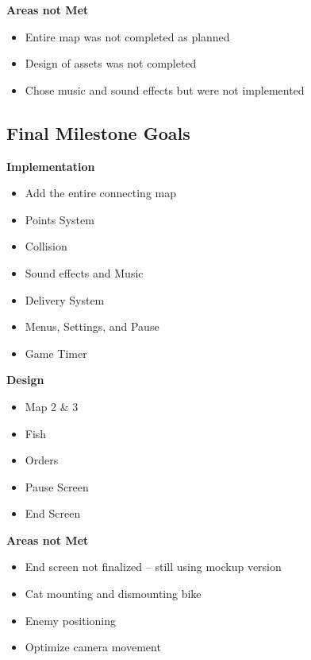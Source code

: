 \documentclass[12pt]{article}
\begin{document}
\bigskip
\begin{minipage}[t]{1\textwidth}
\textbf{Areas not Met}
\begin{itemize}[itemsep=-1pt, topsep=5pt]
    \item Entire map was not completed as planned
    \item Design of assets was not completed
    \item Chose music and sound effects but were not implemented
\end{itemize}
\end{minipage}

\par\bigskip


\subsection{Final Milestone Goals}
\bigskip
\noindent
\hspace{0.52cm}
\begin{minipage}[t]{0.48\textwidth}
\textbf{Implementation}
\begin{itemize}[itemsep=-1pt, topsep=5pt]
    \item Add the entire connecting map 
    \item Points System
    \item Collision
    \item Sound effects and Music
    \item Delivery System
    \item Menus, Settings, and Pause
    \item Game Timer
\end{itemize}
\end{minipage}%
\hfill
\begin{minipage}[t]{0.48\textwidth}
\textbf{Design}
\begin{itemize}[itemsep=-1pt, topsep=5pt]
    \item Map 2 \& 3
    \item Fish
    \item Orders
    \item Pause Screen
    \item End Screen
\end{itemize}
\end{minipage}

\bigskip
\begin{minipage}[t]{0.8\textwidth}
\textbf{Areas not Met}
\begin{itemize}[itemsep=-1pt, topsep=5pt]
    \item End screen not finalized – still using mockup version
    \item Cat mounting and dismounting bike
    \item Enemy positioning
    \item Optimize camera movement
\end{itemize}
\end{minipage}
\end{document}
